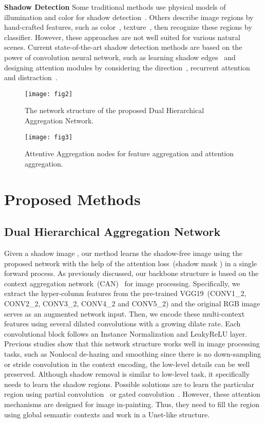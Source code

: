 \documentclass[letterpaper]{article} \usepackage{aaai20}  \usepackage{times}  \usepackage{helvet} \usepackage{courier}  \usepackage[hyphens]{url}  \urlstyle{rm} \def\UrlFont{\rm}  \usepackage{graphicx}  \frenchspacing  \setlength{\pdfpagewidth}{8.5in}  \setlength{\pdfpageheight}{11in}  \usepackage{amssymb}
\begin{document}
\noindent\textbf{Shadow Detection}
Some traditional methods use physical models of illumination and color for shadow detection~\cite{salvador2004cast,panagopoulos2011illumination}. Others describe image regions by hand-crafted features, such as color~\cite{lalonde2010detecting}, texture~\cite{vicente2017leave}, then recognize these regions by classifier. However, these approaches are not well suited for various natural scenes.
Current state-of-the-art shadow detection methods are based on the power of convolution neural network, such as learning shadow edges~\cite{khan2015automatic,shen2015shadow} and 
designing attention modules by considering the direction~\cite{Hu:2018wd}, recurrent attention~\cite{zhu2018bidirectional} and distraction~\cite{zheng2019distraction}.

\begin{figure*}[t]
	\centering
  \texttt{[image: fig2]}
  \caption{The network structure of the proposed  Dual Hierarchical Aggregation Network.}
  \label{fig:network_structure}
\end{figure*}

\begin{figure}[b]
\centering
\texttt{[image: fig3]}
  \caption{Attentive Aggregation nodes for feature aggregation and attention aggregation.}
  \label{fig:aan}
\end{figure}

\section{Proposed Methods}


\subsection{Dual Hierarchical Aggregation Network}

Given a shadow image , our method learns the shadow-free image  using the proposed network with the help of the attention loss~(shadow mask ) in a single forward process. 
As previously discussed, our backbone structure is based on the context aggregation network~(CAN)~\cite{chen2017fast,2018arXiv180605376Z} for image processing. Specifically, we extract the hyper-column features from the pre-trained VGG19~(CONV1\_2, CONV2\_2, CONV3\_2, CONV4\_2 and CONV5\_2) and the original RGB image serves as an augmented network input. Then, we encode these multi-context features using several dilated convolutions with a growing dilate rate. Each convolutional block follows an Instance Normalization and LeakyReLU layer. Previous studies show that this network structure works well in image processing tasks, such as Nonlocal de-hazing and  smoothing since there is no down-sampling or stride convolution in the context encoding, the low-level details can be well preserved. Although shadow removal is similar to low-level task, it specifically needs to learn the shadow regions. Possible solutions are to learn the particular region using partial convolution~\cite{liu2018image} or gated convolution~\cite{yu2018free}.  However, these attention mechanisms are designed for image in-painting. Thus, they need to fill the region using global semantic contexts and work in a Unet-like structure. 
\end{document}
